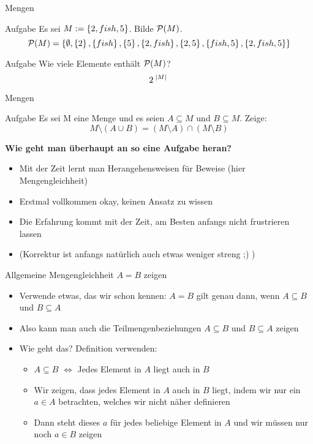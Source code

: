 	\begin{frame}{Mengen}
		\begin{exampleblock}{Aufgabe}
		Es sei $M := \left\{ 2,fish, 5 \right\}$. Bilde $\mathcal{P} (M)$. \\
		\pause
		$$\mathcal{P} (M) = \left\{ \emptyset, \left\{ 2 \right\}, \left\{ fish \right\}, \left\{ 5 \right\}, \left\{ 2,fish \right\}, \left\{ 2, 5 \right\}, \left\{ fish, 5 \right\}, \left\{ 2,fish, 5 \right\} \right\}$$
		\end{exampleblock}
		\pause
		\begin{exampleblock}{Aufgabe}
		Wie viele Elemente enthält $\mathcal{P} (M)$? \\
		\pause
		$$2^{\; \mid M \mid \;}$$
		\end{exampleblock}
	\end{frame}

	\begin{frame}{Mengen}
		\begin{exampleblock}{Aufgabe}
			Es sei M eine Menge und es seien $A \subseteq M$ und $B \subseteq M$. Zeige: \\
			\[M \setminus (A \cup B) = (M \setminus A)  \cap (M \setminus B)\]
		\end{exampleblock}
	\pause
	\medskip
	\textbf{Wie geht man überhaupt an so eine Aufgabe heran?}\\
	\begin{itemize}
		\item Mit der Zeit lernt man Herangehensweisen für Beweise (hier Mengengleichheit)
		\item Erstmal vollkommen okay, keinen Ansatz zu wissen
		\item Die Erfahrung kommt mit der Zeit, am Besten anfangs nicht frustrieren lassen
		\item (Korrektur ist anfangs natürlich auch etwas weniger streng ;) )
	\end{itemize}

	\end{frame}

	\begin{frame}{Allgemeine Mengengleichheit $A=B$ zeigen}

		\begin{itemize}
			\item Verwende etwas, das wir schon kennen: $A=B$ gilt genau dann, wenn $A \subseteq B$ und $B \subseteq A$
			\item Also kann man auch die Teilmengenbeziehungen $A \subseteq B$ und $B \subseteq A$ zeigen
			\pause\item Wie geht das? Definition verwenden: \begin{itemize}
				\item $A \subseteq B$ $\Leftrightarrow$ Jedes Element in $A$ liegt auch in $B$
				\item Wir zeigen, dass jedes Element in $A$ auch in $B$ liegt, indem wir nur ein $a \in A$ betrachten, welches wir nicht näher definieren
				\item Dann steht dieses $a$ für jedes beliebige Element in $A$ und wir müssen nur noch $a \in B$ zeigen
			\end{itemize}
		\end{itemize}

	\end{frame}

